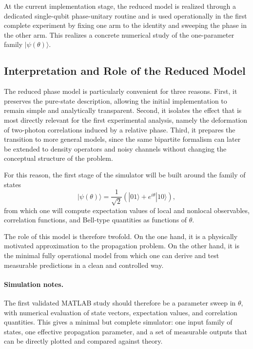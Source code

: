 \documentclass[a4paper]{article}
\begin{document}
At the current implementation stage, the reduced model is realized through a dedicated single-qubit phase-unitary routine and is used operationally in the first complete experiment by fixing one arm to the identity and sweeping the phase in the other arm. This realizes a concrete numerical study of the one-parameter family \( |\psi(\theta)\rangle \).

\subsection{Interpretation and Role of the Reduced Model}

The reduced phase model is particularly convenient for three reasons. First, it preserves the pure-state description, allowing the initial implementation to remain simple and analytically transparent. Second, it isolates the effect that is most directly relevant for the first experimental analysis, namely the deformation of two-photon correlations induced by a relative phase. Third, it prepares the transition to more general models, since the same bipartite formalism can later be extended to density operators and noisy channels without changing the conceptual structure of the problem.

For this reason, the first stage of the simulator will be built around the family of states
\[
|\psi(\theta)\rangle
=
\frac{1}{\sqrt{2}}
\left(
|01\rangle + e^{i\theta}|10\rangle
\right),
\]
from which one will compute expectation values of local and nonlocal observables, correlation functions, and Bell-type quantities as functions of \(\theta\).

The role of this model is therefore twofold. On the one hand, it is a physically motivated approximation to the propagation problem. On the other hand, it is the minimal fully operational model from which one can derive and test measurable predictions in a clean and controlled way.

\paragraph{Simulation notes.}
The first validated MATLAB study should therefore be a parameter sweep in \(\theta\), with numerical evaluation of state vectors, expectation values, and correlation quantities. This gives a minimal but complete simulator: one input family of states, one effective propagation parameter, and a set of measurable outputs that can be directly plotted and compared against theory.
\end{document}
